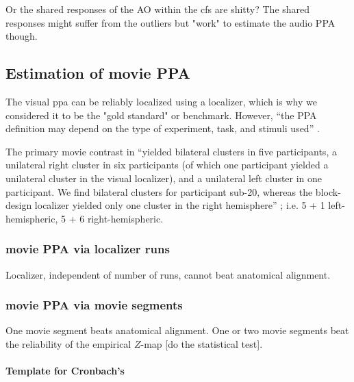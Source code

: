 Or the shared responses of the AO within the \ac{cfs} are shitty?
%
The shared responses might suffer from the outliers but "work" to estimate the
audio PPA though.



\subsection{Estimation of movie PPA}


The visual \ac{ppa} can be reliably localized using a localizer, which is why we
considered it to be the "gold standard" or benchmark.
%
However, ``the PPA definition may depend on the type of experiment, task, and
stimuli used'' \citep{weiner2018defining}.

%
The primary movie contrast in \citet{haeusler2022processing} ``yielded bilateral
clusters in five participants, a unilateral right cluster in six participants
(of which one participant yielded a unilateral cluster in the visual localizer),
and a unilateral left cluster in one participant. We find bilateral clusters for
participant sub-20, whereas the block-design localizer yielded only one cluster
in the right hemisphere'' \citep{haeusler2022processing};
%
i.e. 5 + 1  left-hemispheric, 5 + 6 right-hemispheric.


\subsubsection{movie PPA via localizer runs}

Localizer, independent of number of runs, cannot beat anatomical alignment.


\subsubsection{movie PPA via movie segments}

One movie segment beats anatomical alignment.
%
One or two movie segments beat the reliability of the empirical $Z$-map [do the
statistical test].


\paragraph{Template for Cronbach's}

